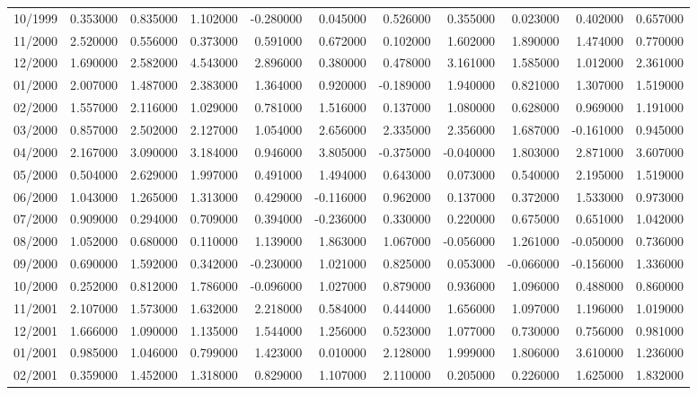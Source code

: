 \begin{tabular}{lrrrrrrrrrr}
10/1999 & 0.353000 & 0.835000 & 1.102000 & -0.280000 & 0.045000 & 0.526000 & 0.355000 & 0.023000 & 0.402000 & 0.657000 \\
11/2000 & 2.520000 & 0.556000 & 0.373000 & 0.591000 & 0.672000 & 0.102000 & 1.602000 & 1.890000 & 1.474000 & 0.770000 \\
12/2000 & 1.690000 & 2.582000 & 4.543000 & 2.896000 & 0.380000 & 0.478000 & 3.161000 & 1.585000 & 1.012000 & 2.361000 \\
01/2000 & 2.007000 & 1.487000 & 2.383000 & 1.364000 & 0.920000 & -0.189000 & 1.940000 & 0.821000 & 1.307000 & 1.519000 \\
02/2000 & 1.557000 & 2.116000 & 1.029000 & 0.781000 & 1.516000 & 0.137000 & 1.080000 & 0.628000 & 0.969000 & 1.191000 \\
03/2000 & 0.857000 & 2.502000 & 2.127000 & 1.054000 & 2.656000 & 2.335000 & 2.356000 & 1.687000 & -0.161000 & 0.945000 \\
04/2000 & 2.167000 & 3.090000 & 3.184000 & 0.946000 & 3.805000 & -0.375000 & -0.040000 & 1.803000 & 2.871000 & 3.607000 \\
05/2000 & 0.504000 & 2.629000 & 1.997000 & 0.491000 & 1.494000 & 0.643000 & 0.073000 & 0.540000 & 2.195000 & 1.519000 \\
06/2000 & 1.043000 & 1.265000 & 1.313000 & 0.429000 & -0.116000 & 0.962000 & 0.137000 & 0.372000 & 1.533000 & 0.973000 \\
07/2000 & 0.909000 & 0.294000 & 0.709000 & 0.394000 & -0.236000 & 0.330000 & 0.220000 & 0.675000 & 0.651000 & 1.042000 \\
08/2000 & 1.052000 & 0.680000 & 0.110000 & 1.139000 & 1.863000 & 1.067000 & -0.056000 & 1.261000 & -0.050000 & 0.736000 \\
09/2000 & 0.690000 & 1.592000 & 0.342000 & -0.230000 & 1.021000 & 0.825000 & 0.053000 & -0.066000 & -0.156000 & 1.336000 \\
10/2000 & 0.252000 & 0.812000 & 1.786000 & -0.096000 & 1.027000 & 0.879000 & 0.936000 & 1.096000 & 0.488000 & 0.860000 \\
11/2001 & 2.107000 & 1.573000 & 1.632000 & 2.218000 & 0.584000 & 0.444000 & 1.656000 & 1.097000 & 1.196000 & 1.019000 \\
12/2001 & 1.666000 & 1.090000 & 1.135000 & 1.544000 & 1.256000 & 0.523000 & 1.077000 & 0.730000 & 0.756000 & 0.981000 \\
01/2001 & 0.985000 & 1.046000 & 0.799000 & 1.423000 & 0.010000 & 2.128000 & 1.999000 & 1.806000 & 3.610000 & 1.236000 \\
02/2001 & 0.359000 & 1.452000 & 1.318000 & 0.829000 & 1.107000 & 2.110000 & 0.205000 & 0.226000 & 1.625000 & 1.832000 \\

\end{tabular}
